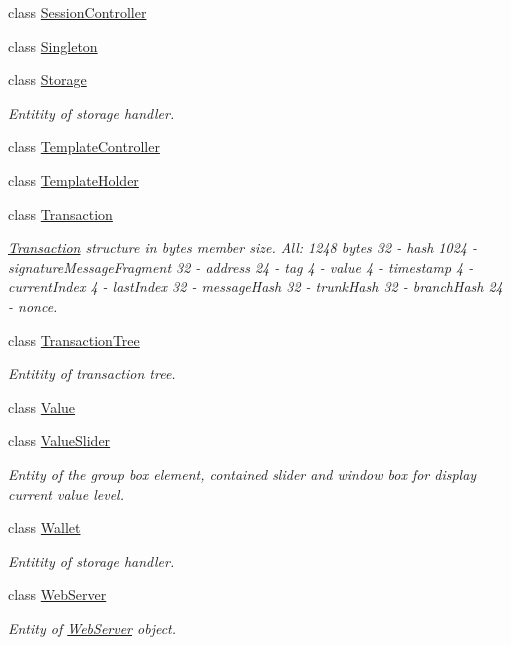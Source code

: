 \begin{DoxyCompactItemize}
class \mbox{\hyperlink{classeven_1_1_session_controller}{Session\+Controller}}
\item 
class \mbox{\hyperlink{classeven_1_1_singleton}{Singleton}}
\item 
class \mbox{\hyperlink{classeven_1_1_storage}{Storage}}
\begin{DoxyCompactList}\small\item\em Entitity of storage handler. \end{DoxyCompactList}\item 
class \mbox{\hyperlink{classeven_1_1_template_controller}{Template\+Controller}}
\item 
class \mbox{\hyperlink{classeven_1_1_template_holder}{Template\+Holder}}
\item 
class \mbox{\hyperlink{classeven_1_1_transaction}{Transaction}}
\begin{DoxyCompactList}\small\item\em \mbox{\hyperlink{classeven_1_1_transaction}{Transaction}} structure in bytes member size. All\+: 1248 bytes 32 -\/ hash 1024 -\/ signature\+Message\+Fragment 32 -\/ address 24 -\/ tag 4 -\/ value 4 -\/ timestamp 4 -\/ current\+Index 4 -\/ last\+Index 32 -\/ message\+Hash 32 -\/ trunk\+Hash 32 -\/ branch\+Hash 24 -\/ nonce. \end{DoxyCompactList}\item 
class \mbox{\hyperlink{classeven_1_1_transaction_tree}{Transaction\+Tree}}
\begin{DoxyCompactList}\small\item\em Entitity of transaction tree. \end{DoxyCompactList}\item 
class \mbox{\hyperlink{classeven_1_1_value}{Value}}
\item 
class \mbox{\hyperlink{classeven_1_1_value_slider}{Value\+Slider}}
\begin{DoxyCompactList}\small\item\em Entity of the group box element, contained slider and window box for display current value level. \end{DoxyCompactList}\item 
class \mbox{\hyperlink{classeven_1_1_wallet}{Wallet}}
\begin{DoxyCompactList}\small\item\em Entitity of storage handler. \end{DoxyCompactList}\item 
class \mbox{\hyperlink{classeven_1_1_web_server}{Web\+Server}}
\begin{DoxyCompactList}\small\item\em Entity of \mbox{\hyperlink{classeven_1_1_web_server}{Web\+Server}} object. \end{DoxyCompactList}\end{DoxyCompactItemize}
